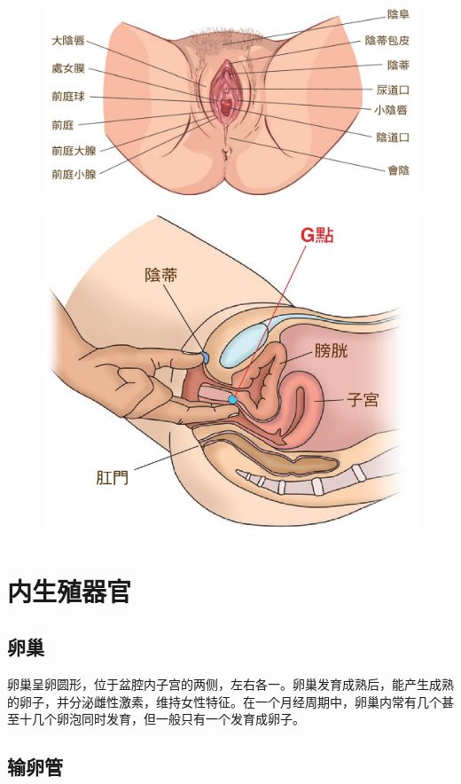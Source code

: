 \documentclass[12pt,UTF8]{ctexbook}
\begin{document}
\begin{figure}[H]
	\centering
	\includegraphics[width=0.7\linewidth]{7}
	\caption{}
	\label{fig:1}
\end{figure}

\begin{figure}[H]
	\centering
	\includegraphics[width=0.7\linewidth]{8}
	\caption{}
	\label{fig:1}
\end{figure}

\section{内生殖器官}

\subsection{卵巢}

卵巢呈卵圆形，位于盆腔内子宫的两侧，左右各一。卵巢发育成熟后，能产生成熟的卵子，并分泌雌性激素，维持女性特征。在一个月经周期中，卵巢内常有几个甚至十几个卵泡同时发育，但一般只有一个发育成卵子。

\subsection{输卵管}
\end{document}
